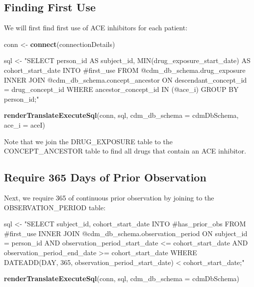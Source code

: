 \documentclass[11pt]{book}
\newenvironment{Shaded}{\begin{snugshade}}{\end{snugshade}}
\newcommand{\KeywordTok}[1]{\textcolor[rgb]{0.13,0.29,0.53}{\textbf{#1}}}
\newcommand{\DataTypeTok}[1]{\textcolor[rgb]{0.13,0.29,0.53}{#1}}
\newcommand{\StringTok}[1]{\textcolor[rgb]{0.31,0.60,0.02}{#1}}
\newcommand{\NormalTok}[1]{#1}
\theoremstyle{definition}
\theoremstyle{definition}
\theoremstyle{definition}
\theoremstyle{remark}
\begin{document}
\subsection{Finding First Use}\label{finding-first-use}

We will first find first use of ACE inhibitors for each patient:

\begin{Shaded}
\begin{Highlighting}[]
\NormalTok{conn <-}\StringTok{ }\KeywordTok{connect}\NormalTok{(connectionDetails)}

\NormalTok{sql <-}\StringTok{ "SELECT person_id AS subject_id,}
\StringTok{  MIN(drug_exposure_start_date) AS cohort_start_date}
\StringTok{INTO #first_use}
\StringTok{FROM @cdm_db_schema.drug_exposure}
\StringTok{INNER JOIN @cdm_db_schema.concept_ancestor}
\StringTok{  ON descendant_concept_id = drug_concept_id}
\StringTok{WHERE ancestor_concept_id IN (@ace_i)}
\StringTok{GROUP BY person_id;"}

\KeywordTok{renderTranslateExecuteSql}\NormalTok{(conn, }
\NormalTok{                          sql, }
                          \DataTypeTok{cdm_db_schema =}\NormalTok{ cdmDbSchema, }
                          \DataTypeTok{ace_i =}\NormalTok{ aceI)}
\end{Highlighting}
\end{Shaded}

Note that we join the DRUG\_EXPOSURE table to the CONCEPT\_ANCESTOR
table to find all drugs that contain an ACE inhibitor.

\subsection{Require 365 Days of Prior
Observation}\label{require-365-days-of-prior-observation}

Next, we require 365 of continuous prior observation by joining to the
OBSERVATION\_PERIOD table:

\begin{Shaded}
\begin{Highlighting}[]
\NormalTok{sql <-}\StringTok{ "SELECT subject_id,}
\StringTok{  cohort_start_date}
\StringTok{INTO #has_prior_obs}
\StringTok{FROM #first_use}
\StringTok{INNER JOIN @cdm_db_schema.observation_period}
\StringTok{  ON subject_id = person_id}
\StringTok{    AND observation_period_start_date <= cohort_start_date}
\StringTok{    AND observation_period_end_date >= cohort_start_date}
\StringTok{WHERE DATEADD(DAY, 365, observation_period_start_date) < cohort_start_date;"}

\KeywordTok{renderTranslateExecuteSql}\NormalTok{(conn, sql, }\DataTypeTok{cdm_db_schema =}\NormalTok{ cdmDbSchema)}
\end{Highlighting}
\end{Shaded}
\end{document}
